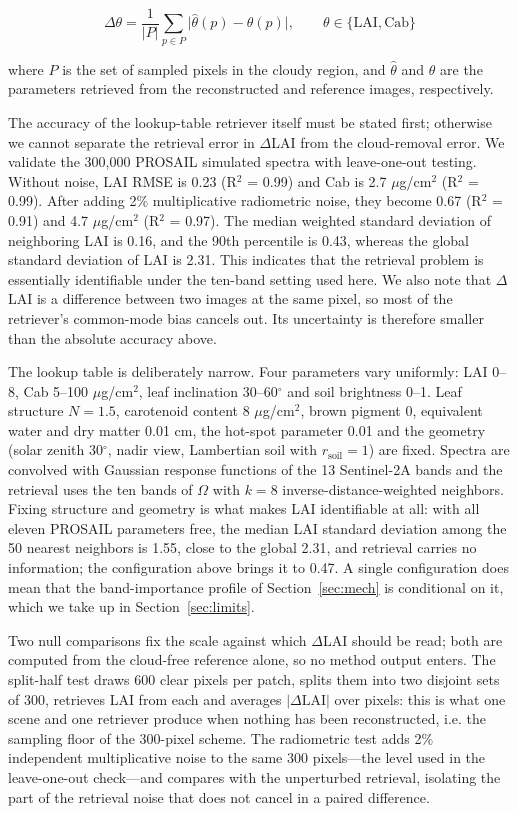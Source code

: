 \documentclass[a4paper,fleqn]{cas-dc}
\begin{document}
\begin{equation}
\Delta\theta=\frac{1}{|P|}\sum_{p\in P}
\bigl|\hat{\theta}(p)-\theta(p)\bigr|,\qquad
\theta\in\{\mathrm{LAI},\mathrm{Cab}\}
\label{eq:dtheta}
\end{equation}

where $P$ is the set of sampled pixels in the cloudy region, and $\hat{\theta}$ and $\theta$ are the parameters retrieved from the reconstructed and reference images, respectively.

The accuracy of the lookup-table retriever itself must be stated first; otherwise we cannot separate the retrieval error in $\Delta$LAI from the cloud-removal error. We validate the 300,000 PROSAIL simulated spectra with leave-one-out testing. Without noise, LAI RMSE is 0.23 (R$^{2}$ = 0.99) and Cab is 2.7 $\mu$g/cm$^{2}$ (R$^{2}$ = 0.99). After adding 2\% multiplicative radiometric noise, they become 0.67 (R$^{2}$ = 0.91) and 4.7 $\mu$g/cm$^{2}$ (R$^{2}$ = 0.97). The median weighted standard deviation of neighboring LAI is 0.16, and the 90th percentile is 0.43, whereas the global standard deviation of LAI is 2.31. This indicates that the retrieval problem is essentially identifiable under the ten-band setting used here. We also note that $\Delta$LAI is a difference between two images at the same pixel, so most of the retriever's common-mode bias cancels out. Its uncertainty is therefore smaller than the absolute accuracy above.

 The lookup table is deliberately narrow. Four parameters vary uniformly: LAI 0--8, Cab 5--100 $\mu$g/cm$^2$, leaf inclination 30--60$^\circ$ and soil brightness 0--1. Leaf structure $N=1.5$, carotenoid content 8 $\mu$g/cm$^2$, brown pigment 0, equivalent water and dry matter 0.01 cm, the hot-spot parameter 0.01 and the geometry (solar zenith 30$^\circ$, nadir view, Lambertian soil with $r_{\mathrm{soil}}=1$) are fixed. Spectra are convolved with Gaussian response functions of the 13 Sentinel-2A bands and the retrieval uses the ten bands of $\Omega$ with $k=8$ inverse-distance-weighted neighbors. Fixing structure and geometry is what makes LAI identifiable at all: with all eleven PROSAIL parameters free, the median LAI standard deviation among the 50 nearest neighbors is 1.55, close to the global 2.31, and retrieval carries no information; the configuration above brings it to 0.47. A single configuration does mean that the band-importance profile of Section~\ref{sec:mech} is conditional on it, which we take up in Section~\ref{sec:limits}.

 Two null comparisons fix the scale against which $\Delta$LAI should be read; both are computed from the cloud-free reference alone, so no method output enters. The split-half test draws 600 clear pixels per patch, splits them into two disjoint sets of 300, retrieves LAI from each and averages $|\Delta\mathrm{LAI}|$ over pixels: this is what one scene and one retriever produce when nothing has been reconstructed, i.e. the sampling floor of the 300-pixel scheme. The radiometric test adds 2\% independent multiplicative noise to the same 300 pixels---the level used in the leave-one-out check---and compares with the unperturbed retrieval, isolating the part of the retrieval noise that does not cancel in a paired difference.
\end{document}
